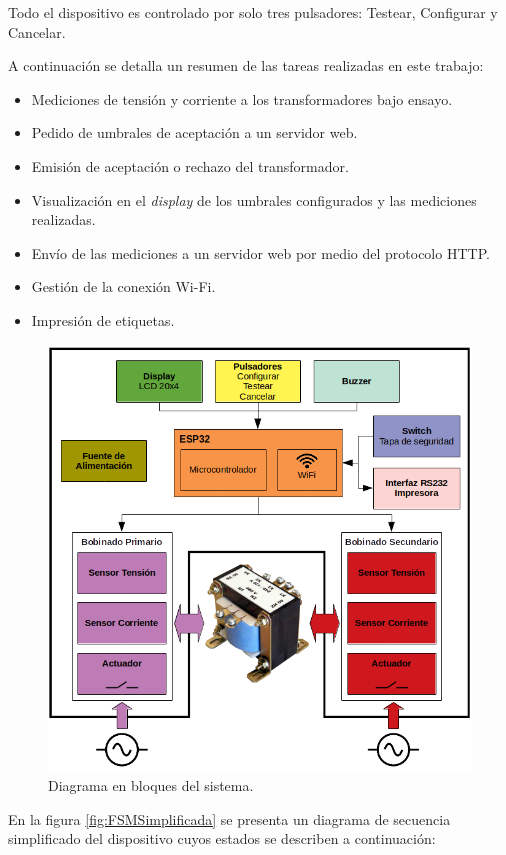 Todo el dispositivo es controlado por solo tres pulsadores: Testear, Configurar y Cancelar.

A continuación se detalla un resumen de las tareas realizadas en este trabajo:
\begin{itemize}
\item Mediciones de tensión y corriente a los transformadores bajo ensayo.
\item Pedido de umbrales de aceptación a un servidor web.
\item Emisión de aceptación o rechazo del transformador.
\item Visualización en el \textit{display} de los umbrales configurados y las mediciones realizadas.
\item Envío de las mediciones a un servidor web por medio del protocolo HTTP.
\item Gestión de la conexión Wi-Fi.
\item Impresión de etiquetas. 
\end{itemize}

\begin{figure}[htpb]
\centering 
\includegraphics[width=.8\textwidth]{./Figures/diagBloques.png}
\caption{Diagrama en bloques del sistema.}
\label{fig:diagBloques}
\end{figure}


En la figura \ref{fig:FSMSimplificada} se presenta un diagrama de secuencia simplificado del dispositivo cuyos estados se describen a continuación:

